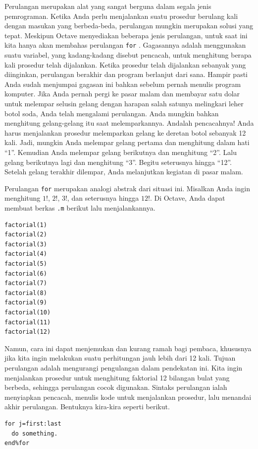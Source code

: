 Perulangan merupakan alat yang sangat berguna dalam segala jenis pemrograman.
Ketika Anda perlu menjalankan suatu prosedur berulang kali dengan
masukan yang berbeda-beda, perulangan mungkin merupakan solusi yang
tepat. Meskipun Octave menyediakan beberapa jenis perulangan, untuk
saat ini kita hanya akan membahas perulangan \texttt{for} .
Gagasannya adalah menggunakan suatu variabel, yang kadang-kadang disebut
pencacah, untuk menghitung berapa kali prosedur telah dijalankan.
Ketika prosedur telah dijalankan sebanyak yang diinginkan, perulangan
berakhir dan program berlanjut dari sana. Hampir pasti Anda sudah
menjumpai gagasan ini bahkan sebelum pernah menulis program komputer.
Jika Anda pernah pergi ke pasar malam dan membayar satu dolar untuk
melempar selusin gelang dengan harapan salah satunya melingkari leher
botol soda, Anda telah mengalami perulangan. Anda mungkin bahkan menghitung
gelang-gelang itu saat melemparkannya. Andalah pencacahnya! Anda harus
menjalankan prosedur melemparkan gelang ke deretan botol sebanyak
12 kali. Jadi, mungkin Anda melempar gelang pertama dan menghitung
dalam hati ``1''. Kemudian Anda melempar gelang berikutnya dan menghitung
``2''. Lalu gelang berikutnya lagi dan menghitung ``3''. Begitu
seterusnya hingga ``12''. Setelah gelang terakhir dilempar, Anda
melanjutkan kegiatan di pasar malam. 

Perulangan \texttt{for} merupakan analogi abstrak dari situasi ini.
Misalkan Anda ingin menghitung $1!$, $2!$, $3!$, dan seterusnya
hingga $12!$. Di Octave, Anda dapat membuat berkas \texttt{.m} berikut
lalu menjalankannya. \begin{verbatim}
factorial(1)
factorial(2)
factorial(3)
factorial(4)
factorial(5)
factorial(6)
factorial(7)
factorial(8)
factorial(9)
factorial(10)
factorial(11)
factorial(12)
\end{verbatim}

\noindent Namun, cara ini dapat menjemukan dan kurang ramah bagi pembaca,
khususnya jika kita ingin melakukan suatu perhitungan jauh lebih dari
12 kali. Tujuan perulangan adalah mengurangi pengulangan dalam pendekatan
ini. Kita ingin menjalankan prosedur untuk menghitung faktorial 12
bilangan bulat yang berbeda, sehingga perulangan cocok digunakan.
Sintaks perulangan ialah menyiapkan pencacah, menulis kode untuk menjalankan
prosedur, lalu menandai akhir  perulangan.
Bentuknya kira-kira seperti berikut. \begin{verbatim}
for j=first:last
  do something. 
end%for
\end{verbatim}

